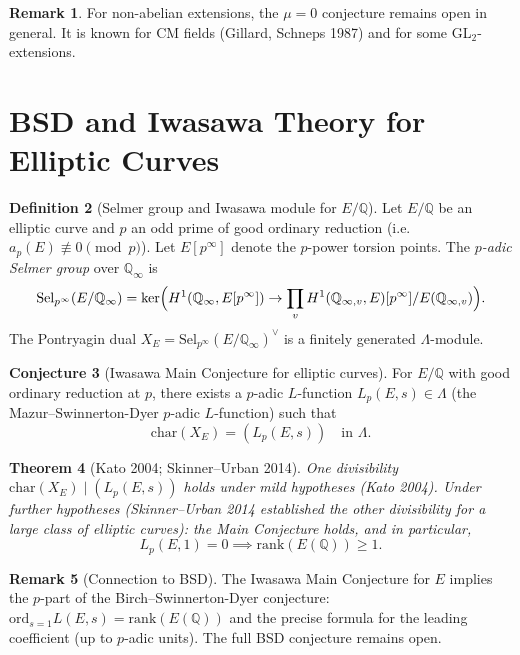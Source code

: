 \documentclass[12pt,a4paper]{amsart}
\newtheorem{theorem}{Theorem}[section]
\theoremstyle{definition}
\newtheorem{definition}[theorem]{Definition}
\newtheorem{remark}[theorem]{Remark}
\newtheorem{conjecture}[theorem]{Conjecture}
\newcommand{\Q}{\mathbb{Q}}
\newcommand{\ord}{\mathrm{ord}}
\begin{document}
\begin{remark}
For non-abelian extensions, the $\mu = 0$ conjecture remains open in general.
It is known for CM fields (Gillard, Schneps 1987) and for some GL$_2$-extensions.
\end{remark}

\section{BSD and Iwasawa Theory for Elliptic Curves}

\begin{definition}[Selmer group and Iwasawa module for $E/\Q$]
\label{def:selmer_iwasawa}
Let $E/\Q$ be an elliptic curve and $p$ an odd prime of good ordinary
reduction (i.e.\ $a_p(E) \not\equiv 0 \pmod{p}$).  Let $E[p^\infty]$
denote the $p$-power torsion points.  The \emph{$p$-adic Selmer group}
over $\Q_\infty$ is
\[
  \mathrm{Sel}_{p^\infty}(E/\Q_\infty)
  = \ker\Bigl(H^1(\Q_\infty, E[p^\infty]) \to
    \prod_v H^1(\Q_{\infty,v}, E)[p^\infty]/E(\Q_{\infty,v})\Bigr).
\]
The Pontryagin dual $X_E = \mathrm{Sel}_{p^\infty}(E/\Q_\infty)^\vee$
is a finitely generated $\Lambda$-module.
\end{definition}

\begin{conjecture}[Iwasawa Main Conjecture for elliptic curves]
\label{conj:ec_main}
For $E/\Q$ with good ordinary reduction at $p$, there exists a
$p$-adic $L$-function $L_p(E, s) \in \Lambda$ (the Mazur--Swinnerton-Dyer
$p$-adic $L$-function) such that
\[
  \mathrm{char}(X_E) = (L_p(E, s)) \quad \text{in } \Lambda.
\]
\end{conjecture}

\begin{theorem}[Kato 2004; Skinner--Urban 2014]
\label{thm:kato_su}
One divisibility $\mathrm{char}(X_E) \mid (L_p(E, s))$ holds under mild
hypotheses (Kato 2004).  Under further hypotheses (Skinner--Urban 2014
established the other divisibility for a large class of elliptic curves):
the Main Conjecture holds, and in particular,
\[
  L_p(E, 1) = 0 \implies \mathrm{rank}(E(\Q)) \ge 1.
\]
\end{theorem}

\begin{remark}[Connection to BSD]
The Iwasawa Main Conjecture for $E$ implies the $p$-part of the
Birch--Swinnerton-Dyer conjecture: $\ord_{s=1} L(E,s) = \mathrm{rank}(E(\Q))$
and the precise formula for the leading coefficient (up to $p$-adic units).
The full BSD conjecture remains open.
\end{remark}
\end{document}
